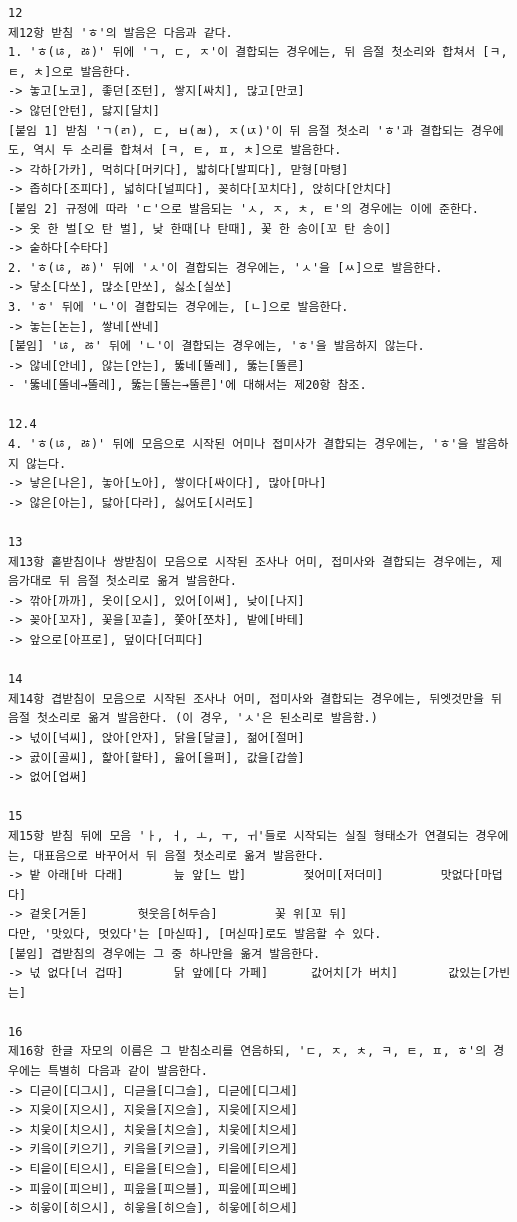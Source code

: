 \documentclass[letterpaper]{article} %
\begin{document}
\begin{verbatim}
12
제12항 받침 'ㅎ'의 발음은 다음과 같다.
1. 'ㅎ(ㄶ, ㅀ)' 뒤에 'ㄱ, ㄷ, ㅈ'이 결합되는 경우에는, 뒤 음절 첫소리와 합쳐서 [ㅋ, ㅌ, ㅊ]으로 발음한다.
-> 놓고[노코], 좋던[조턴], 쌓지[싸치], 많고[만코]
-> 않던[안턴], 닳지[달치]
[붙임 1] 받침 'ㄱ(ㄺ), ㄷ, ㅂ(ㄼ), ㅈ(ㄵ)'이 뒤 음절 첫소리 'ㅎ'과 결합되는 경우에도, 역시 두 소리를 합쳐서 [ㅋ, ㅌ, ㅍ, ㅊ]으로 발음한다.
-> 각하[가카], 먹히다[머키다], 밟히다[발피다], 맏형[마텽]
-> 좁히다[조피다], 넓히다[널피다], 꽂히다[꼬치다], 앉히다[안치다]
[붙임 2] 규정에 따라 'ㄷ'으로 발음되는 'ㅅ, ㅈ, ㅊ, ㅌ'의 경우에는 이에 준한다.
-> 옷 한 벌[오 탄 벌], 낮 한때[나 탄때], 꽃 한 송이[꼬 탄 송이]
-> 숱하다[수타다]
2. 'ㅎ(ㄶ, ㅀ)' 뒤에 'ㅅ'이 결합되는 경우에는, 'ㅅ'을 [ㅆ]으로 발음한다.
-> 닿소[다쏘], 많소[만쏘], 싫소[실쏘]
3. 'ㅎ' 뒤에 'ㄴ'이 결합되는 경우에는, [ㄴ]으로 발음한다.
-> 놓는[논는], 쌓네[싼네]
[붙임] 'ㄶ, ㅀ' 뒤에 'ㄴ'이 결합되는 경우에는, 'ㅎ'을 발음하지 않는다.
-> 않네[안네], 않는[안는], 뚫네[뚤레], 뚫는[뚤른]
- '뚫네[뚤네→뚤레], 뚫는[뚤는→뚤른]'에 대해서는 제20항 참조.

12.4
4. 'ㅎ(ㄶ, ㅀ)' 뒤에 모음으로 시작된 어미나 접미사가 결합되는 경우에는, 'ㅎ'을 발음하지 않는다.
-> 낳은[나은], 놓아[노아], 쌓이다[싸이다], 많아[마나]
-> 않은[아는], 닳아[다라], 싫어도[시러도]

13
제13항 홑받침이나 쌍받침이 모음으로 시작된 조사나 어미, 접미사와 결합되는 경우에는, 제 음가대로 뒤 음절 첫소리로 옮겨 발음한다.
-> 깎아[까까], 옷이[오시], 있어[이써], 낮이[나지]
-> 꽂아[꼬자], 꽃을[꼬츨], 쫓아[쪼차], 밭에[바테]
-> 앞으로[아프로], 덮이다[더피다]

14
제14항 겹받침이 모음으로 시작된 조사나 어미, 접미사와 결합되는 경우에는, 뒤엣것만을 뒤 음절 첫소리로 옮겨 발음한다. (이 경우, 'ㅅ'은 된소리로 발음함.)
-> 넋이[넉씨], 앉아[안자], 닭을[달글], 젊어[절머]
-> 곬이[골씨], 핥아[할타], 읊어[을퍼], 값을[갑쓸]
-> 없어[업써]

15
제15항 받침 뒤에 모음 'ㅏ, ㅓ, ㅗ, ㅜ, ㅟ'들로 시작되는 실질 형태소가 연결되는 경우에는, 대표음으로 바꾸어서 뒤 음절 첫소리로 옮겨 발음한다.
-> 밭 아래[바 다래] 		늪 앞[느 밥] 		젖어미[저더미] 		맛없다[마덥다]
-> 겉옷[거돋] 		헛웃음[허두슴] 		꽃 위[꼬 뒤]
다만, '맛있다, 멋있다'는 [마싣따], [머싣따]로도 발음할 수 있다.
[붙임] 겹받침의 경우에는 그 중 하나만을 옮겨 발음한다.
-> 넋 없다[너 겁따] 		닭 앞에[다 가페] 		값어치[가 버치] 		값있는[가빈는]

16
제16항 한글 자모의 이름은 그 받침소리를 연음하되, 'ㄷ, ㅈ, ㅊ, ㅋ, ㅌ, ㅍ, ㅎ'의 경우에는 특별히 다음과 같이 발음한다.
-> 디귿이[디그시], 디귿을[디그슬], 디귿에[디그세]
-> 지읒이[지으시], 지읒을[지으슬], 지읒에[지으세]
-> 치읓이[치으시], 치읓을[치으슬], 치읓에[치으세]
-> 키읔이[키으기], 키읔을[키으글], 키읔에[키으게]
-> 티읕이[티으시], 티읕을[티으슬], 티읕에[티으세]
-> 피읖이[피으비], 피읖을[피으블], 피읖에[피으베]
-> 히읗이[히으시], 히읗을[히으슬], 히읗에[히으세]


\end{verbatim}
\end{document}
